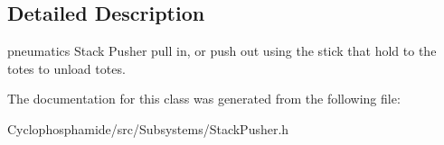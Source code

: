 \subsection{Detailed Description}
pneumatics Stack Pusher pull in, or push out using the stick that hold to the totes to unload totes. 

The documentation for this class was generated from the following file\+:\begin{DoxyCompactItemize}
\item 
Cyclophosphamide/src/\+Subsystems/Stack\+Pusher.\+h\end{DoxyCompactItemize}
